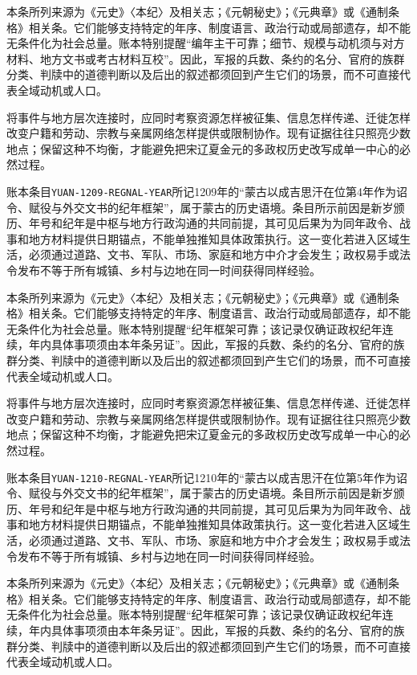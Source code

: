 本条所列来源为《元史》〈本纪〉及相关志；《元朝秘史》；《元典章》或《通制条格》相关条。它们能够支持特定的年序、制度语言、政治行动或局部遗存，却不能无条件化为社会总量。账本特别提醒“编年主干可靠；细节、规模与动机须与对方材料、地方文书或考古材料互校”。因此，军报的兵数、条约的名分、官府的族群分类、判牍中的道德判断以及后出的叙述都须回到产生它们的场景，而不可直接代表全域动机或人口。

将事件与地方层次连接时，应同时考察资源怎样被征集、信息怎样传递、迁徙怎样改变户籍和劳动、宗教与亲属网络怎样提供或限制协作。现有证据往往只照亮少数地点；保留这种不均衡，才能避免把宋辽夏金元的多政权历史改写成单一中心的必然过程。

账本条目\texttt{YUAN-1209-REGNAL-YEAR}所记1209年的“蒙古以成吉思汗在位第4年作为诏令、赋役与外交文书的纪年框架”，属于蒙古的历史语境。条目所示前因是新岁颁历、年号和纪年是中枢与地方行政沟通的共同前提，其可见后果为为同年政令、战事和地方材料提供日期锚点，不能单独推知具体政策执行。这一变化若进入区域生活，必须通过道路、文书、军队、市场、家庭和地方中介才会发生；政权易手或法令发布不等于所有城镇、乡村与边地在同一时间获得同样经验。

本条所列来源为《元史》〈本纪〉及相关志；《元朝秘史》；《元典章》或《通制条格》相关条。它们能够支持特定的年序、制度语言、政治行动或局部遗存，却不能无条件化为社会总量。账本特别提醒“纪年框架可靠；该记录仅确证政权纪年连续，年内具体事项须由本年条另证”。因此，军报的兵数、条约的名分、官府的族群分类、判牍中的道德判断以及后出的叙述都须回到产生它们的场景，而不可直接代表全域动机或人口。

将事件与地方层次连接时，应同时考察资源怎样被征集、信息怎样传递、迁徙怎样改变户籍和劳动、宗教与亲属网络怎样提供或限制协作。现有证据往往只照亮少数地点；保留这种不均衡，才能避免把宋辽夏金元的多政权历史改写成单一中心的必然过程。

账本条目\texttt{YUAN-1210-REGNAL-YEAR}所记1210年的“蒙古以成吉思汗在位第5年作为诏令、赋役与外交文书的纪年框架”，属于蒙古的历史语境。条目所示前因是新岁颁历、年号和纪年是中枢与地方行政沟通的共同前提，其可见后果为为同年政令、战事和地方材料提供日期锚点，不能单独推知具体政策执行。这一变化若进入区域生活，必须通过道路、文书、军队、市场、家庭和地方中介才会发生；政权易手或法令发布不等于所有城镇、乡村与边地在同一时间获得同样经验。

本条所列来源为《元史》〈本纪〉及相关志；《元朝秘史》；《元典章》或《通制条格》相关条。它们能够支持特定的年序、制度语言、政治行动或局部遗存，却不能无条件化为社会总量。账本特别提醒“纪年框架可靠；该记录仅确证政权纪年连续，年内具体事项须由本年条另证”。因此，军报的兵数、条约的名分、官府的族群分类、判牍中的道德判断以及后出的叙述都须回到产生它们的场景，而不可直接代表全域动机或人口。

